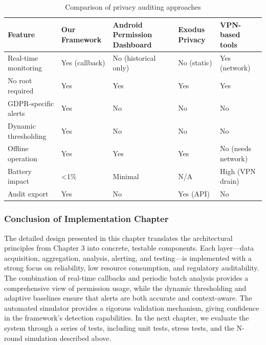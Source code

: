 \begin{table}[H]
\centering
\caption{Comparison of privacy auditing approaches}
\label{tab:comparison}
\begin{tabular}{p{3cm}|p{3cm}|p{3cm}|p{3cm}}
\toprule
\textbf{Feature} & \textbf{Our Framework} & \textbf{Android Permission Dashboard} & \textbf{Exodus Privacy} & \textbf{VPN-based tools} \\
\midrule
Real-time monitoring & Yes (callback) & No (historical only) & No (static) & Yes (network) \\
No root required & Yes & Yes & Yes & Yes \\
GDPR-specific alerts & Yes & No & No & No \\
Dynamic thresholding & Yes & No & No & No \\
Offline operation & Yes & Yes & Yes & No (needs network) \\
Battery impact & <1\% & Minimal & N/A & High (VPN drain) \\
Audit export & Yes & No & Yes (API) & No \\
\bottomrule
\end{tabular}
\end{table}

\subsubsection{Conclusion of Implementation Chapter}

The detailed design presented in this chapter translates the architectural principles from Chapter 3 into concrete, testable components. Each layer—data acquisition, aggregation, analysis, alerting, and testing—is implemented with a strong focus on reliability, low resource consumption, and regulatory auditability. The combination of real-time callbacks and periodic batch analysis provides a comprehensive view of permission usage, while the dynamic thresholding and adaptive baselines ensure that alerts are both accurate and context-aware. The automated simulator provides a rigorous validation mechanism, giving confidence in the framework's detection capabilities. In the next chapter, we evaluate the system through a series of tests, including unit tests, stress tests, and the N-round simulation described above.

